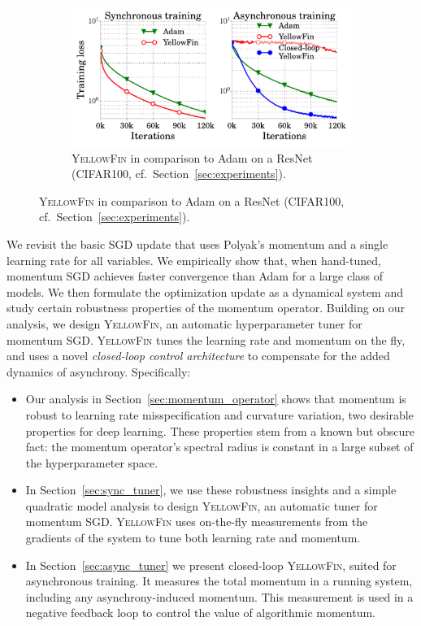 \documentclass{article}
\newcommand{\tuner}{\textsc{YellowFin}\xspace}
\newcommand{\asynctuner}{closed-loop \textsc{YellowFin}\xspace}
\begin{document}
\begin{figure}
\vspace{-2.0em}
\begin{minipage}{1.0\linewidth}
\begin{figure}[H]
	\includegraphics[width=1.\linewidth]{experiment_results/spotlight.pdf}
	\caption{\tuner in comparison to Adam on a ResNet (CIFAR100, cf.\ Section~\ref{sec:experiments}).	
	}
\end{figure}
\end{minipage}
\end{figure}
We revisit the basic SGD update that uses Polyak's momentum and a single learning rate for all variables.
We empirically show that, when hand-tuned, momentum SGD achieves faster convergence than Adam for a large class of models.
We then formulate the optimization update as a dynamical system and study certain robustness properties of the momentum operator.
Building on our analysis, we design \tuner, an automatic hyperparameter tuner for momentum SGD.
\tuner tunes the learning rate and momentum on the fly, and uses a novel {\em closed-loop control architecture} to compensate for the added dynamics of asynchrony.
Specifically:
\begin{itemize}[leftmargin=2em]
\setlength\itemsep{0.2em}
\item
Our analysis in Section~\ref{sec:momentum_operator} shows that momentum is robust to learning rate misspecification and curvature variation,
two desirable properties for deep learning.
These properties stem from a known but obscure fact:
the momentum operator's spectral radius is constant in a large subset of the hyperparameter space.
\item
In Section~\ref{sec:sync_tuner}, we use these robustness insights and a simple quadratic model analysis to design \tuner, an automatic tuner for momentum SGD.
\tuner uses on-the-fly measurements from the gradients of the system to tune both learning rate and momentum.
\item In Section~\ref{sec:async_tuner} we present \asynctuner, suited for asynchronous training.
It measures the total momentum in a running system, including any asynchrony-induced momentum. 
This measurement is used in a negative feedback loop to control the value of algorithmic momentum.%

\end{itemize}
\end{document}
